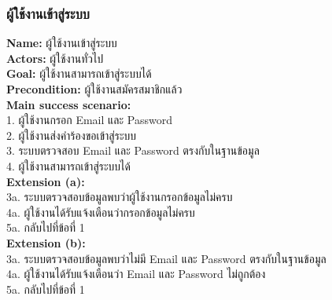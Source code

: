 \documentclass[12pt,oneside,openright,a4paper]{cpe-thai-project}
\begin{document}
\subsubsection{ผู้ใช้งานเข้าสู่ระบบ}
\textbf{Name: }ผู้ใช้งานเข้าสู่ระบบ \\
\textbf{Actors: }ผู้ใช้งานทั่วไป \\
\textbf{Goal: }ผู้ใช้งานสามารถเข้าสู่ระบบได้ \\
\textbf{Precondition: }ผู้ใช้งานสมัครสมาชิกแล้ว \\
\textbf{Main success scenario: } \\
  \hspace*{0.5cm}1. ผู้ใช้งานกรอก Email และ Password \\
  \hspace*{0.5cm}2. ผู้ใช้งานส่งคำร้องขอเข้าสู่ระบบ \\
  \hspace*{0.5cm}3. ระบบตรวจสอบ Email และ Password ตรงกับในฐานข้อมูล \\
  \hspace*{0.5cm}4. ผู้ใช้งานสามารถเข้าสู่ระบบได้ \\ \newpage
\textbf{Extension (a): } \\ 
  \hspace*{0.5cm}3a. ระบบตรวจสอบข้อมูลพบว่าผู้ใช้งานกรอกข้อมูลไม่ครบ \\
  \hspace*{0.5cm}4a. ผู้ใช้งานได้รับแจ้งเตือนว่ากรอกข้อมูลไม่ครบ \\
  \hspace*{0.5cm}5a. กลับไปที่ข้อที่ 1 \\
\textbf{Extension (b): }  \\
  \hspace*{0.5cm}3a. ระบบตรวจสอบข้อมูลพบว่าไม่มี Email และ Password ตรงกับในฐานข้อมูล \\
  \hspace*{0.5cm}4a. ผู้ใช้งานได้รับแจ้งเตือนว่า Email และ Password ไม่ถูกต้อง \\
  \hspace*{0.5cm}5a. กลับไปที่ข้อที่ 1 
\end{document}
